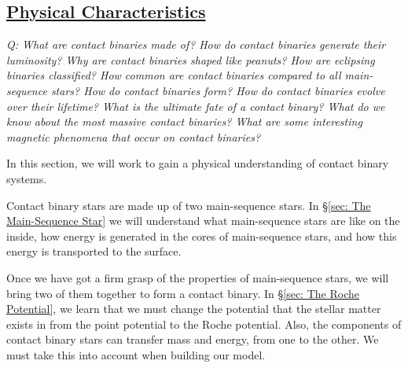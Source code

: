 \documentclass[12pt]{article} %
\numberwithin{equation}{section} %
\begin{document}






\subsection[Physical Characteristics]{\hyperlink{toc}{Physical Characteristics}}

\emph{Q: What are contact binaries made of? How do contact binaries generate their luminosity? Why are contact binaries shaped like peanuts? How are eclipsing binaries classified? How common are contact binaries compared to all main-sequence stars? How do contact binaries form? How do contact binaries evolve over their lifetime? What is the ultimate fate of a contact binary? What do we know about the most massive contact binaries? What are some interesting magnetic phenomena that occur on contact binaries?  }

In this section, we will work to gain a physical understanding of contact binary systems.

Contact binary stars are made up of two main-sequence stars. In \S \ref{sec: The Main-Sequence Star} we will understand what main-sequence stars are like on the inside, how energy is generated in the cores of main-sequence stars, and how this energy is transported to the surface.

Once we have got a firm grasp of the properties of main-sequence stars, we will bring two of them together to form a contact binary. In \S \ref{sec: The Roche Potential}, we learn that we must change the potential that the stellar matter exists in from the point potential to the Roche potential. Also, the components of contact binary stars can transfer mass and energy, from one to the other. We must take this into account when building our model.
\end{document}
